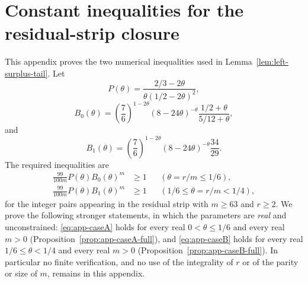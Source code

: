 %
%

\section{Constant inequalities for the residual-strip closure}\label{app:constants}

This appendix proves the two numerical inequalities used in
Lemma~\ref{lem:left-surplus-tail}.  Let
\[
        P(\theta)=\frac{2/3-2\theta}{\theta(1/2-2\theta)^2},
\]
\[
        B_0(\theta)=
        \left(\frac76\right)^{1-2\theta}
        (8-24\theta)^{-\theta}
        \frac{1/2+\theta}{5/12+\theta},
\]
and
\[
        B_1(\theta)=
        \left(\frac76\right)^{1-2\theta}
        (8-24\theta)^{-\theta}
        \frac{34}{29}.
\]
The required inequalities are
\begin{align}
        \frac{99}{100m}P(\theta)B_0(\theta)^m&\ge1
        &&(\theta=r/m\le1/6),\label{eq:app-caseA}\\
        \frac{99}{100m}P(\theta)B_1(\theta)^m&\ge1
        &&(1/6\le\theta=r/m<1/4),\label{eq:app-caseB}
\end{align}
for the integer pairs appearing in the residual strip with $m\ge63$ and
$r\ge2$.  We prove the following stronger statements, in which the parameters
are \emph{real} and unconstrained: \eqref{eq:app-caseA} holds for every real
$0<\theta\le1/6$ and every real $m>0$
(Proposition~\ref{prop:app-caseA-full}), and \eqref{eq:app-caseB} holds for
every real $1/6\le\theta<1/4$ and every real $m>0$
(Proposition~\ref{prop:app-caseB-full}).  In particular no finite
verification, and no use of the integrality of $r$ or of the parity or size
of $m$, remains in this appendix.

